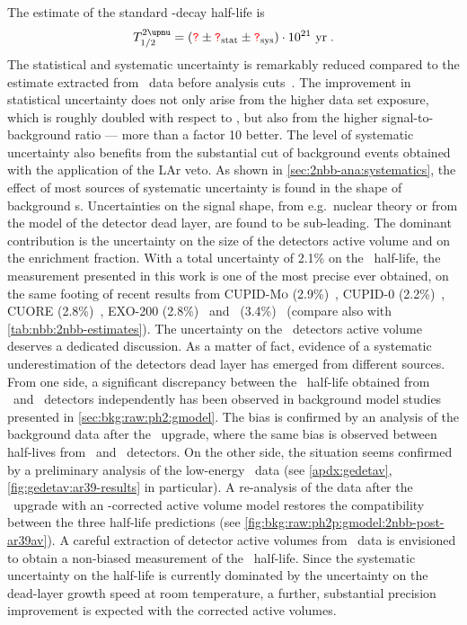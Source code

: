 The estimate of the standard \nnbb-decay half-life is
\[
  \thalftwoM = (\fillme{?} \pm \stat{\fillme{?}} \pm \syst{\fillme{?}}) \cdot 10^{21}~\text{yr} \;.
\]
The statistical and systematic uncertainty is remarkably reduced compared to the estimate
extracted from \phaseone\ data before analysis cuts~\cite{Agostini2015a}. The improvement
in statistical uncertainty does not only arise from the higher data set exposure,
which is roughly doubled with respect to \phaseone, but also from the higher
signal-to-background ratio --- more than a factor 10 better. The level of systematic
uncertainty also benefits from the substantial cut of background events obtained with the
application of the LAr veto. As shown in \cref{sec:2nbb-ana:systematics}, the effect of
most sources of systematic uncertainty is found in the shape of background \pdf{}s.
Uncertainties on the signal shape, from e.g.~nuclear theory or from the model of the detector dead
layer, are found to be sub-leading. The dominant contribution is the uncertainty on the
size of the detectors active volume and on the enrichment fraction. With a total
uncertainty of 2.1\% on the \nnbb\ half-life, the measurement presented in this work is
one of the most precise ever obtained, on the same footing of recent results from
\textsc{CUPID-Mo} (2.9\%)~\cite{Armengaud2019}, CUPID-0 (2.2\%)~\cite{Azzolini2019a},
CUORE (2.8\%)~\cite{Caminata2019}, EXO-200 (2.8\%)~\cite{Albert2013} and \kamlandzen\
(3.4\%)~\cite{Gando2019} (compare also with \cref{tab:nbb:2nbb-estimates}).
\newpar
The uncertainty on the \bege\ detectors active volume deserves a dedicated discussion.
As a matter of fact, evidence of a systematic underestimation of the detectors dead layer
has emerged from different sources. From one side, a significant discrepancy between the
\nnbb\ half-life obtained from \scoax\ and \bege\ detectors independently has been
observed in background model studies presented in \cref{sec:bkg:raw:ph2:gmodel}. The bias
is confirmed by an analysis of the background data after the \phasetwop\ upgrade, where
the same bias is observed between half-lives from \bege\ and \icoax\ detectors. On the
other side, the situation seems confirmed by a preliminary analysis of the low-energy
\Arl\ data (see \cref{apdx:gedetav}, \cref{fig:gedetav:ar39-results} in particular). A
re-analysis of the data after the \phasetwop\ upgrade with an \Arl-corrected active
volume model restores the compatibility between the three half-life predictions (see
\cref{fig:bkg:raw:ph2p:gmodel:2nbb-post-ar39av}). A careful extraction of detector active
volumes from \Arl\ data is envisioned to obtain a non-biased measurement of the \nnbb\
half-life. Since the systematic uncertainty on the half-life is currently dominated by the
uncertainty on the dead-layer growth speed at room temperature, a further, substantial
precision improvement is expected with the corrected active volumes.

